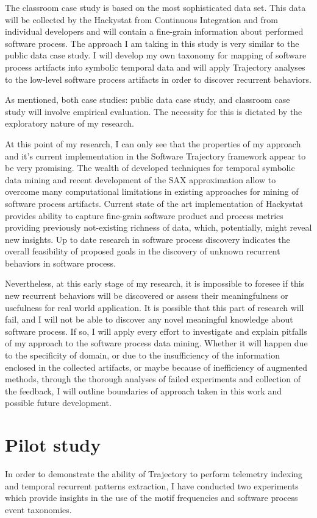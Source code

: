 The classroom case study is based on the most sophisticated data set. This data will be collected by the Hackystat from Continuous Integration and from individual developers and will contain a fine-grain information about performed software process. The approach I am taking in this study is very similar to the public data case study. I will develop my own taxonomy for mapping of software process artifacts into symbolic temporal data and will apply Trajectory analyses to the low-level software process artifacts in order to discover recurrent behaviors. 

As mentioned, both case studies: public data case study, and classroom case study will involve empirical evaluation. The necessity for this is dictated by the exploratory nature of my research. 

At this point of my research, I can only see that the properties of my approach and it's current implementation in the Software Trajectory framework appear to be very promising. The wealth of developed techniques for temporal symbolic data mining and recent development of the SAX approximation allow to overcome many computational limitations in existing approaches for mining of software process artifacts. Current state of the art implementation of Hackystat provides ability to capture fine-grain software product and process metrics providing previously not-existing richness of data, which, potentially, might reveal new insights. Up to date research in software process discovery indicates the overall feasibility of proposed goals in the discovery of unknown recurrent behaviors in software process. 

Nevertheless, at this early stage of my research, it is impossible to foresee if this new recurrent behaviors will be discovered or assess their meaningfulness or usefulness for real world application. It is possible that this part of research will fail, and I will not be able to discover any novel meaningful knowledge about software process. If so, I will apply every effort to investigate and explain pitfalls of my approach to the software process data mining. Whether it will happen due to the specificity of domain, or due to the insufficiency of the information enclosed in the collected artifacts, or maybe because of inefficiency of augmented methods, through the thorough analyses of failed experiments and collection of the feedback, I will outline boundaries of approach taken in this work and possible future development.

\section{Pilot study}\label{pilot.evaluation}
In order to demonstrate the ability of Trajectory to perform telemetry indexing and temporal recurrent patterns extraction, I have conducted two experiments which provide insights in the use of the motif frequencies and software process event taxonomies. 

